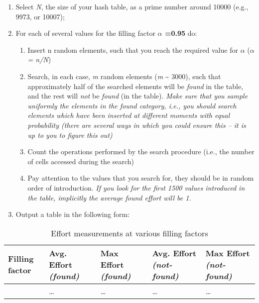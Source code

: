 \documentclass[../en-fa-lab.tex]{subfiles}
\begin{document}
\begin{enumerate}
\def\labelenumi{\arabic{enumi}.}
\item
  Select \emph{N}, the size of your hash table, as a prime number around
  10000 (e.g., 9973, or 10007);
\item
  For each of several values for the filling factor \textbf{\emph{$\alpha$} =0.95} do:

  \begin{enumerate}
  \def\labelenumii{\alph{enumii}.}
  \item
    Insert n random elements, such that you reach the required value for
    \emph{$\alpha$} (\emph{$\alpha$ = n/N})
  \item
    Search, in each case, \emph{m} random elements (\emph{m}
    \textasciitilde{} 3000), such that approximately half of the
    searched elements will be \emph{found} in the table, and the rest
    will \emph{not} be \emph{found} (in the table). \emph{Make sure that
    you sample uniformly the elements in the found category, i.e., you
    should search elements which have been inserted at different moments
    with equal probability (there are several ways in which you could
    ensure this -- it is up to you to figure this out)}
  \item
    Count the operations performed by the search procedure (i.e., the
    number of cells accessed during the search)
  \item
    Pay attention to the values that you search for, they should be in
    random order of introduction. \emph{If you look for the first 1500
    values introduced in the table, implicitly the average found effort
    will be 1.}
  \end{enumerate}
\item
  Output a table in the following form:
\end{enumerate}

\begin{table}[ht]
  \centering
  \caption{Effort measurements at various filling factors}
  \label{tbl:effort-vs-filling}
  \begin{tabularx}{\textwidth}{%
      >{\centering\arraybackslash}X
      >{\centering\arraybackslash}X
      >{\centering\arraybackslash}X
      >{\centering\arraybackslash}X
      >{\centering\arraybackslash}X
    }
    \toprule
    \textbf{Filling factor}
      & \textbf{Avg. Effort \emph{(found)}}
      & \textbf{Max Effort \emph{(found)}}
      & \textbf{Avg. Effort \emph{(not-found)}}
      & \textbf{Max Effort \emph{(not-found)}} \\
    \midrule
    0.95 & … & … & … & … \\
    \bottomrule
  \end{tabularx}
\end{table}
\end{document}

